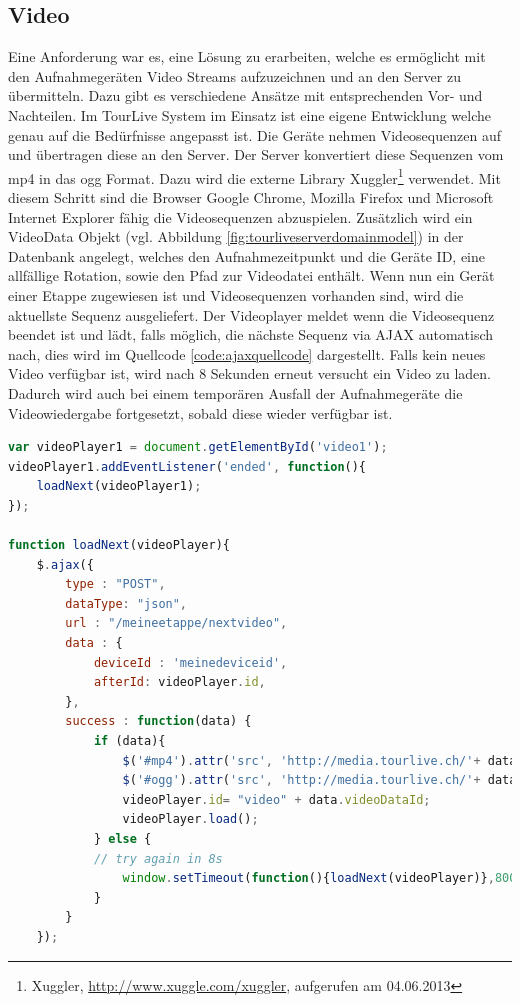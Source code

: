\subsection{Video}
Eine Anforderung war es, eine Lösung zu erarbeiten, welche es ermöglicht mit den Aufnahmegeräten Video Streams aufzuzeichnen und an den Server zu übermitteln. Dazu gibt es verschiedene Ansätze mit entsprechenden Vor- und Nachteilen. Im TourLive System im Einsatz ist eine eigene Entwicklung welche genau auf die Bedürfnisse angepasst ist. Die Geräte nehmen Videosequenzen auf und übertragen diese an den Server. Der Server konvertiert diese Sequenzen vom mp4 in das ogg Format. Dazu wird die externe Library Xuggler\footnote{Xuggler, \url{http://www.xuggle.com/xuggler}, aufgerufen am 04.06.2013} verwendet. Mit diesem Schritt sind die Browser Google Chrome, Mozilla Firefox und Microsoft Internet Explorer fähig die Videosequenzen abzuspielen. Zusätzlich wird ein VideoData Objekt (vgl. Abbildung \ref{fig:tourliveserverdomainmodel}) in der Datenbank angelegt, welches den Aufnahmezeitpunkt und die Geräte ID, eine allfällige Rotation, sowie den Pfad zur Videodatei enthält. Wenn nun ein Gerät einer Etappe zugewiesen ist und Videosequenzen vorhanden sind, wird die aktuellste Sequenz ausgeliefert. Der Videoplayer meldet wenn die Videosequenz beendet ist und lädt, falls möglich, die nächste Sequenz via AJAX automatisch nach, dies wird im Quellcode \ref{code:ajaxquellcode} dargestellt. Falls kein neues Video verfügbar ist, wird nach 8 Sekunden erneut versucht ein Video zu laden. Dadurch wird auch bei einem temporären Ausfall der Aufnahmegeräte die Videowiedergabe fortgesetzt, sobald diese wieder verfügbar ist.

\begin{lstlisting}[language=JavaScript, caption=Automatisches Nachladen von Videosequenzen, label=code:ajaxquellcode]
var videoPlayer1 = document.getElementById('video1');
videoPlayer1.addEventListener('ended', function(){
	loadNext(videoPlayer1);
});

function loadNext(videoPlayer){
	$.ajax({
		type : "POST",
		dataType: "json",
		url : "/meineetappe/nextvideo",
		data : {
			deviceId : 'meinedeviceid',
			afterId: videoPlayer.id,
		},
		success : function(data) {
			if (data){
				$('#mp4').attr('src', 'http://media.tourlive.ch/'+ data.videoLocation + '.mp4');
				$('#ogg').attr('src', 'http://media.tourlive.ch/'+ data.videoLocation + '.ogg');
				videoPlayer.id= "video" + data.videoDataId;
				videoPlayer.load();
			} else {
			// try again in 8s
				window.setTimeout(function(){loadNext(videoPlayer)},8000);
			}
		}
	});
\end{lstlisting}

